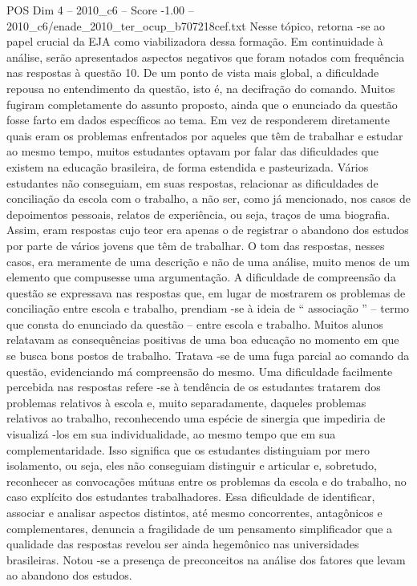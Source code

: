 \begin{textsample}{POS Dim 4 – 2010\_c6 – Score -1.00 – 2010\_c6/enade\_2010\_ter\_ocup\_b707218cef.txt}
Nesse tópico, retorna -se ao papel crucial da EJA como viabilizadora dessa formação.
Em continuidade à análise, serão apresentados aspectos negativos que foram notados com frequência nas respostas à questão 10.
De um ponto de vista mais global, a dificuldade repousa no entendimento da questão, isto é, na decifração do comando.
Muitos fugiram completamente do assunto proposto, ainda que o enunciado da questão fosse farto em dados específicos ao tema.
Em vez de responderem diretamente quais eram os problemas enfrentados por aqueles que têm de trabalhar e estudar ao mesmo tempo, muitos estudantes optavam por falar das dificuldades que existem na educação brasileira, de forma estendida e pasteurizada.
Vários estudantes não conseguiam, em suas respostas, relacionar as dificuldades de conciliação da escola com o trabalho, a não ser, como já mencionado, nos casos de depoimentos pessoais, relatos de experiência, ou seja, traços de uma biografia.
Assim, eram respostas cujo teor era apenas o de registrar o abandono dos estudos por parte de vários jovens que têm de trabalhar.
O tom das respostas, nesses casos, era meramente de uma descrição e não de uma análise, muito menos de um elemento que compusesse uma argumentação.
A dificuldade de compreensão da questão se expressava nas respostas que, em lugar de mostrarem os problemas de conciliação entre escola e trabalho, prendiam -se à ideia de “ associação ” – termo que consta do enunciado da questão – entre escola e trabalho.
Muitos alunos relatavam as consequências positivas de uma boa educação no momento em que se busca bons postos de trabalho.
Tratava -se de uma fuga parcial ao comando da questão, evidenciando má compreensão do mesmo.
Uma dificuldade facilmente percebida nas respostas refere -se à tendência de os estudantes tratarem dos problemas relativos à escola e, muito separadamente, daqueles problemas relativos ao trabalho, reconhecendo uma espécie de sinergia que impediria de visualizá -los em sua individualidade, ao mesmo tempo que em sua complementaridade.
Isso significa que os estudantes distinguiam por mero isolamento, ou seja, eles não conseguiam distinguir e articular e, sobretudo, reconhecer as convocações mútuas entre os problemas da escola e do trabalho, no caso explícito dos estudantes trabalhadores.
Essa dificuldade de identificar, associar e analisar aspectos distintos, até mesmo concorrentes, antagônicos e complementares, denuncia a fragilidade de um pensamento simplificador que a qualidade das respostas revelou ser ainda hegemônico nas universidades brasileiras.
Notou -se a presença de preconceitos na análise dos fatores que levam ao abandono dos estudos.

\end{textsample}
